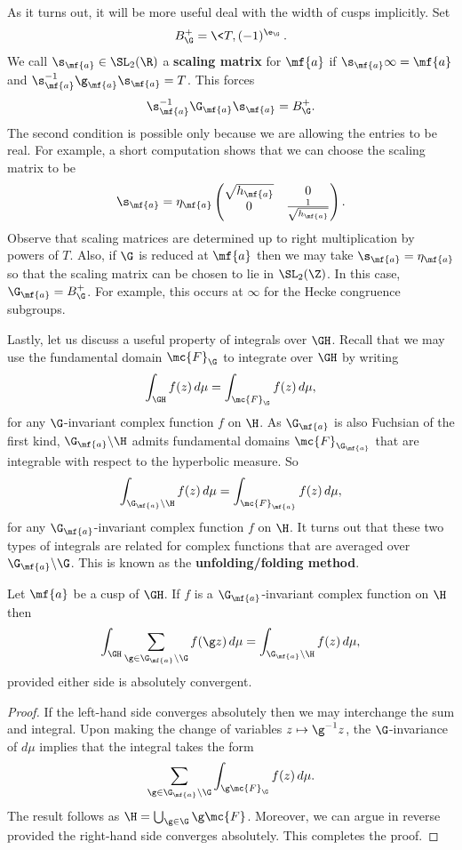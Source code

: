 \documentclass[12pt]{article}
\begin{document}
      As it turns out, it will be more useful deal with the width of cusps implicitly. Set
      \[
        B_{\G}^{+} = \<T,(-1)^{\e_{\G}}\>.
      \]
      We call \(\s_{\mf{a}} \in \SL_{2}(\R)\)  a \textbf{scaling matrix} for \(\mf{a}\) if \(\s_{\mf{a}}\infty = \mf{a}\) and \(\s_{\mf{a}}^{-1}\g_{\mf{a}}\s_{\mf{a}} = T\). This forces
      \[
        \s_{\mf{a}}^{-1}\G_{\mf{a}}\s_{\mf{a}} = B_{\G}^{+}.
      \]
      The second condition is possible only because we are allowing the entries to be real. For example, a short computation shows that we can choose the scaling matrix to be
      \[
        \s_{\mf{a}} = \eta_{\mf{a}}\begin{pmatrix} \sqrt{h_{\mf{a}}} & 0 \\ 0 & \frac{1}{\sqrt{h_{\mf{a}}}} \end{pmatrix}.
      \]
      Observe that scaling matrices are determined up to right multiplication by powers of \(T\). Also, if \(\G\) is reduced at \(\mf{a}\) then we may take \(\s_{\mf{a}} = \eta_{\mf{a}}\) so that the scaling matrix can be chosen to lie in \(\SL_{2}(\Z)\). In this case, \(\G_{\mf{a}} = B_{\G}^{+}\). For example, this occurs at \(\infty\) for the Hecke congruence subgroups.

      Lastly, let us discuss a useful property of integrals over \(\GH\). Recall that we may use the fundamental domain \(\mc{F}_{\G}\) to integrate over \(\GH\) by writing
      \[
        \int_{\GH}f(z)\,d\mu = \int_{\mc{F}_{\G}}f(z)\,d\mu,
      \]
      for any \(\G\)-invariant complex function \(f\) on \(\H\). As \(\G_{\mf{a}}\) is also Fuchsian of the first kind, \(\G_{\mf{a}}\backslash\H\) admits fundamental domains \(\mc{F}_{\G_{\mf{a}}}\) that are integrable with respect to the hyperbolic measure. So
      \[
        \int_{\G_{\mf{a}}\backslash\H}f(z)\,d\mu = \int_{\mc{F}_{\mf{a}}}f(z)\,d\mu,
      \]
      for any \(\G_{\mf{a}}\)-invariant complex function \(f\) on \(\H\). It turns out that these two types of integrals are related for complex functions that are averaged over \(\G_{\mf{a}}\backslash\G\). This is known as the \textbf{unfolding/folding method}.

      \begin{theorem*}
        Let \(\mf{a}\) be a cusp of \(\GH\). If \(f\) is a \(\G_{\mf{a}}\)-invariant complex function on \(\H\) then
        \[
          \int_{\GH}\sum_{\g \in \G_{\mf{a}}\backslash\G}f(\g z)\,d\mu = \int_{\G_{\mf{a}}\backslash\H}f(z)\,d\mu,
        \]
        provided either side is absolutely convergent.
      \end{theorem*}
      \begin{proof}
        If the left-hand side converges absolutely then we may interchange the sum and integral. Upon making the change of variables \(z \mapsto \g^{-1}z\), the \(\G\)-invariance of \(d\mu\) implies that the integral takes the form
        \[
          \sum_{\g \in \G_{\mf{a}}\backslash\G}\int_{\g\mc{F}_{\G}}f(z)\,d\mu.
        \]
        The result follows as \(\H = \bigcup_{\g \in \G}\g\mc{F}\). Moreover, we can argue in reverse provided the right-hand side converges absolutely. This completes the proof.
      \end{proof}
\end{document}
